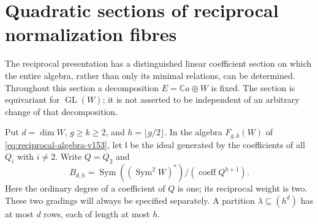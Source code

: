 \documentclass[11pt,reqno]{amsart}
\numberwithin{equation}{section}
\theoremstyle{definition}\newtheorem{definition}[theorem]{Definition}
\theoremstyle{remark}\newtheorem{remark}[theorem]{Remark}
\newcommand{\C}{\mathbb C}\newcommand{\Q}{\mathbb Q}
\DeclareMathOperator{\Sym}{Sym}\DeclareMathOperator{\Gr}{Gr}
\begin{document}
\section{Quadratic sections of reciprocal normalization fibres}
\label{sec:quadratic-sections-v155}
The reciprocal presentation has a distinguished linear coefficient
section on which the entire algebra, rather than only its minimal
relations, can be determined.  Throughout this section a decomposition
$E=\C a\oplus W$ is fixed.  The section is equivariant for
$\operatorname{GL}(W)$; it is not asserted to be independent of an
arbitrary change of that decomposition.

Put $d=\dim W$, $g\geq k\geq2$, and $h=\lfloor g/2\rfloor$.
In the algebra $F_{g,k}(W)$ of \eqref{eq:reciprocal-algebra-v153},
let $\mathfrak l$ be the ideal generated by the coefficients of all
$Q_i$ with $i\ne2$.  Write $Q=Q_2$ and
\begin{equation}\label{eq:quadratic-section-v155}
 B_{d,h}=\Sym((\Sym^2W)^*)/
                    (\operatorname{coeff}Q^{h+1}).
\end{equation}
Here the ordinary degree of a coefficient of $Q$ is one; its
reciprocal weight is two.  These two gradings will always be
specified separately.  A partition $\lambda\subseteq(h^d)$ has
at most $d$ rows, each of length at most $h$.
\end{document}
